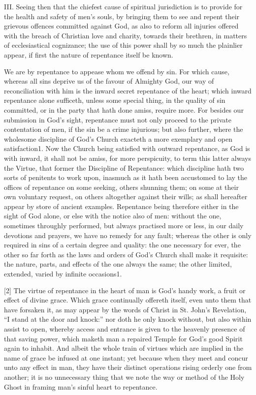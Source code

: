 III. Seeing then that the chiefest cause of spiritual jurisdiction is to provide for the health and safety of men’s souls, by bringing them to see and repent their grievous offences committed against God, as also to reform all injuries offered with the breach of Christian love and charity, towards their brethren, in matters of ecclesiastical cognizance; the use of this power shall by so much the plainlier appear, if first the nature of repentance itself be known.

We are by repentance to appease whom we offend by sin. For which cause, whereas all sins deprive us of the favour of Almighty God, our way of reconciliation with him is the inward secret repentance of the heart; which inward repentance alone sufficeth, unless some special thing, in the quality of sin committed, or in the party that hath done amiss, require more. For besides our submission in God’s sight, repentance must not only proceed to the private contentation of men, if the sin be a crime injurious; but also further, where the wholesome discipline of God’s Church exacteth a more exemplary and open satisfaction1. Now the Church being satisfied with outward repentance, as God is with inward, it shall not be amiss, for more perspicuity, to term this latter always the Virtue, that former the Discipline of Repentance: which discipline hath two sorts of penitents to work upon, inasmuch as it hath been accustomed to lay the offices of repentance on some seeking, others shunning them; on some at their own voluntary request, on others altogether against their wills; as shall hereafter appear by store of ancient examples. Repentance being therefore either in the sight of God alone, or else with the notice also of men: without the one, sometimes throughly performed, but always practised more or less, in our daily devotions and prayers, we have no remedy for any fault; whereas the other is only required in sins of a certain degree and quality: the one necessary for ever, the other so far forth as the laws and orders of God’s Church shall make it requisite: the nature, parts, and effects of the one always the same; the other limited, extended, varied by infinite occasions1.

[2] The virtue of repentance in the heart of man is God’s handy work, a fruit or effect of divine grace. Which grace continually offereth itself, even unto them that have forsaken it, as may appear by the words of Christ in St. John’s Revelation, “I stand at the door and knock:” nor doth he only knock without, but also within assist to open, whereby access and entrance is given to the heavenly presence of that saving power, which maketh man a repaired Temple for God’s good Spirit again to inhabit. And albeit the whole train of virtues which are implied in the name of grace be infused at one instant; yet because when they meet and concur unto any effect in man, they have their distinct operations rising orderly one from another; it is no unnecessary thing that we note the way or method of the Holy Ghost in framing man’s sinful heart to repentance.

